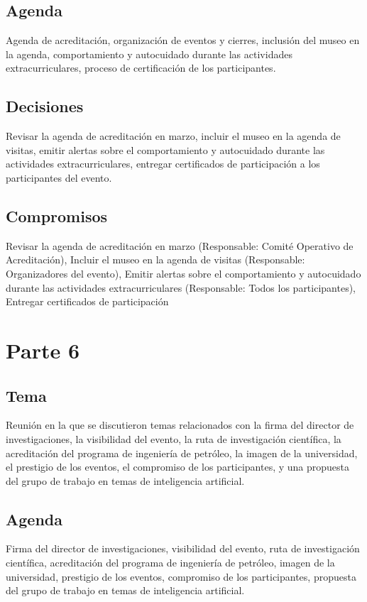 \documentclass{article}
\begin{document}
\subsection{Agenda}
Agenda de acreditación, organización de eventos y cierres, inclusión del museo en la agenda, comportamiento y autocuidado durante las actividades extracurriculares, proceso de certificación de los participantes.

\subsection{Decisiones}
Revisar la agenda de acreditación en marzo, incluir el museo en la agenda de visitas, emitir alertas sobre el comportamiento y autocuidado durante las actividades extracurriculares, entregar certificados de participación a los participantes del evento.

\subsection{Compromisos}
Revisar la agenda de acreditación en marzo (Responsable: Comité Operativo de Acreditación), Incluir el museo en la agenda de visitas (Responsable: Organizadores del evento), Emitir alertas sobre el comportamiento y autocuidado durante las actividades extracurriculares (Responsable: Todos los participantes), Entregar certificados de participación
\section{Parte 6}
\subsection{Tema}
Reunión en la que se discutieron temas relacionados con la firma del director de investigaciones, la visibilidad del evento, la ruta de investigación científica, la acreditación del programa de ingeniería de petróleo, la imagen de la universidad, el prestigio de los eventos, el compromiso de los participantes, y una propuesta del grupo de trabajo en temas de inteligencia artificial.

\subsection{Agenda}
Firma del director de investigaciones, visibilidad del evento, ruta de investigación científica, acreditación del programa de ingeniería de petróleo, imagen de la universidad, prestigio de los eventos, compromiso de los participantes, propuesta del grupo de trabajo en temas de inteligencia artificial.
\end{document}
